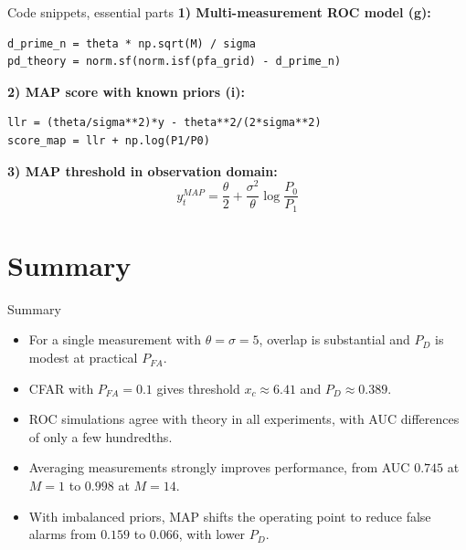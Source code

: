 \documentclass[aspectratio=169,10pt]{beamer}
\begin{document}
\begin{frame}[fragile]{Code snippets, essential parts}
\footnotesize
\textbf{1) Multi-measurement ROC model (g):}
\begin{verbatim}
d_prime_n = theta * np.sqrt(M) / sigma
pd_theory = norm.sf(norm.isf(pfa_grid) - d_prime_n)
\end{verbatim}
\vspace{0.4em}
\textbf{2) MAP score with known priors (i):}
\begin{verbatim}
llr = (theta/sigma**2)*y - theta**2/(2*sigma**2)
score_map = llr + np.log(P1/P0)
\end{verbatim}
\vspace{0.4em}
\textbf{3) MAP threshold in observation domain:}
\[
y_t^{MAP}=\frac{\theta}{2}+\frac{\sigma^2}{\theta}\log\frac{P_0}{P_1}
\]
\end{frame}

\section*{Summary}

\begin{frame}{Summary}
\begin{itemize}
\item For a single measurement with $\theta=\sigma=5$, overlap is substantial and $P_D$ is modest at practical $P_{FA}$.
\item CFAR with $P_{FA}=0.1$ gives threshold $x_c\approx 6.41$ and $P_D\approx 0.389$.
\item ROC simulations agree with theory in all experiments, with AUC differences of only a few hundredths.
\item Averaging measurements strongly improves performance, from AUC $0.745$ at $M=1$ to $0.998$ at $M=14$.
\item With imbalanced priors, MAP shifts the operating point to reduce false alarms from $0.159$ to $0.066$, with lower $P_D$.
\end{itemize}
\end{frame}
\end{document}
